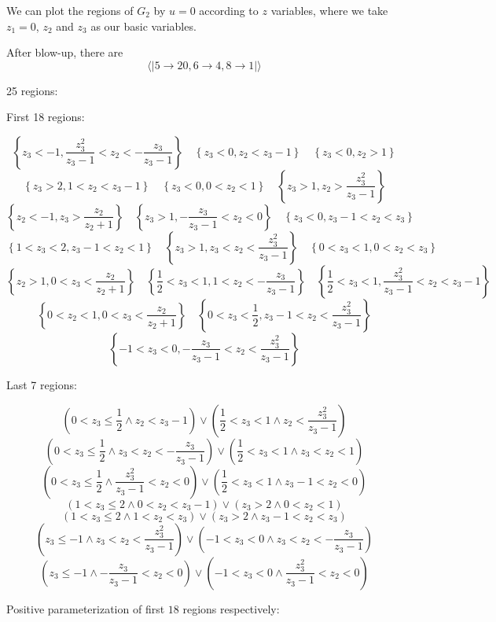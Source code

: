 \documentclass[12pt]{article}
\theoremstyle{definition}
\theoremstyle{plain}
\begin{document}
We can plot the regions of $G_2$ by $u=0$ according to $z$ variables,
where we take $z_1=0$, $z_2$ and $z_3$ as our basic variables.

After blow-up, there are 
\[
    \langle|5 \to 20, 6 \to 4, 8 \to 1|\rangle
\]


25 regions:

First 18 regions:

\[\left\{z_3<-1,\frac{z_3^2}{z_3-1}<z_2<-\frac{z_3}{z_3-1}\right\}
\quad\left\{z_3<0,z_2<z_3-1\right\}
\quad\left\{z_3<0,z_2>1\right\}\]
\[\left\{z_3>2,1<z_2<z_3-1\right\}
\quad \left\{z_3<0,0<z_2<1\right\}
\quad \left\{z_3>1,z_2>\frac{z_3^2}{z_3-1}\right\}\]
\[\left\{z_2<-1,z_3>\frac{z_2}{z_2+1}\right\}
\quad \left\{z_3>1,-\frac{z_3}{z_3-1}<z_2<0\right\}
\quad \left\{z_3<0,z_3-1<z_2<z_3\right\}\]
\[\left\{1<z_3<2,z_3-1<z_2<1\right\}
\quad \left\{z_3>1,z_3<z_2<\frac{z_3^2}{z_3-1}\right\}
\quad \left\{0<z_3<1,0<z_2<z_3\right\}\]
\[\left\{z_2>1,0<z_3<\frac{z_2}{z_2+1}\right\}
\quad \left\{\frac{1}{2}<z_3<1,1<z_2<-\frac{z_3}{z_3-1}\right\}
\quad \left\{\frac{1}{2}<z_3<1,\frac{z_3^2}{z_3-1}<z_2<z_3-1\right\}\]
\[\left\{0<z_2<1,0<z_3<\frac{z_2}{z_2+1}\right\}
\quad \left\{0<z_3<\frac{1}{2},z_3-1<z_2<\frac{z_3^2}{z_3-1}\right\}\]
\[\left\{-1<z_3<0,-\frac{z_3}{z_3-1}<z_2<\frac{z_3^2}{z_3-1}\right\}\]

Last 7 regions:

\[\left(0<z_3\leq \frac{1}{2}\land z_2<z_3-1\right)\lor \left(\frac{1}{2}<z_3<1\land z_2<\frac{z_3^2}{z_3-1}\right)\]
\[\left(0<z_3\leq \frac{1}{2}\land z_3<z_2<-\frac{z_3}{z_3-1}\right)\lor \left(\frac{1}{2}<z_3<1\land z_3<z_2<1\right)\]
\[\left(0<z_3\leq \frac{1}{2}\land \frac{z_3^2}{z_3-1}<z_2<0\right)\lor \left(\frac{1}{2}<z_3<1\land z_3-1<z_2<0\right)\]
\[\left(1<z_3\leq 2\land 0<z_2<z_3-1\right)\lor \left(z_3>2\land 0<z_2<1\right)\]
\[\left(1<z_3\leq 2\land 1<z_2<z_3\right)\lor \left(z_3>2\land z_3-1<z_2<z_3\right)\]
\[\left(z_3\leq -1\land z_3<z_2<\frac{z_3^2}{z_3-1}\right)\lor \left(-1<z_3<0\land z_3<z_2<-\frac{z_3}{z_3-1}\right)\]
\[\left(z_3\leq -1\land -\frac{z_3}{z_3-1}<z_2<0\right)\lor \left(-1<z_3<0\land \frac{z_3^2}{z_3-1}<z_2<0\right)\]

Positive parameterization of first $18$ regions respectively:
\end{document}
